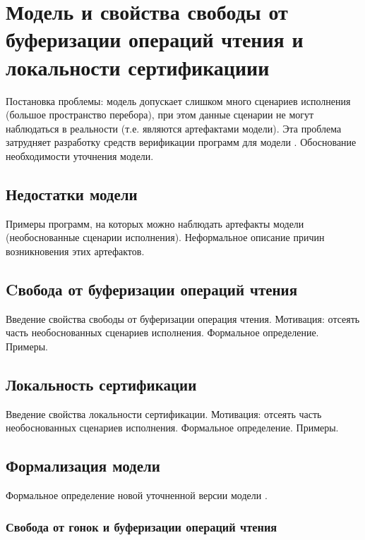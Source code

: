 \chapter{Модель \WkmS и свойства свободы от буферизации операций чтения и локальности сертификациии}
\label{ch:weakestmo2}

Постановка проблемы: модель \Wkm допускает слишком много
сценариев исполнения (большое пространство перебора),
при этом данные сценарии не могут наблюдаться в реальности
(т.е. являются артефактами модели).
Эта проблема затрудняет разработку средств верификации
программ для модели \Wkm. 
Обоснование необходимости уточнения модели.

\section{Недостатки модели \Wkm}

Примеры программ, на которых можно наблюдать
артефакты модели \Wkm (необоснованные сценарии исполнения).
Неформальное описание причин возникновения этих артефактов. 

\section{Cвобода от буферизации операций чтения}

Введение свойства свободы от буферизации операция чтения.
Мотивация: отсеять часть необоснованных сценариев исполнения.
Формальное определение. Примеры. 

\section{Локальность сертификации}

Введение свойства локальности сертификации.
Мотивация: отсеять часть необоснованных сценариев исполнения.
Формальное определение. Примеры. 

\section{Формализация модели \WkmS}

Формальное определение новой уточненной версии модели \WkmS.

\subsection{Свобода от гонок и буферизации операций чтения}

